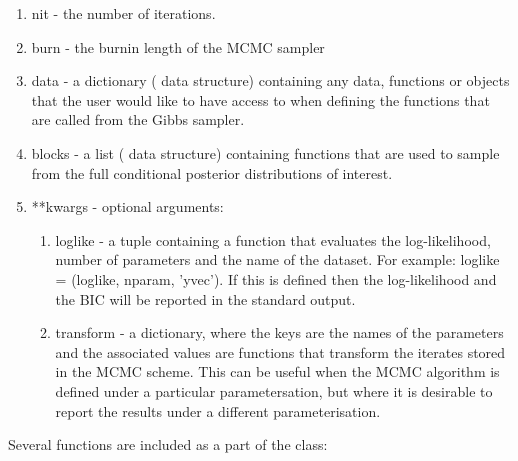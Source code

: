 \documentclass[article]{jss}
\begin{document}
\begin{enumerate}
\item nit - the number of iterations. 
\item burn - the burnin length of the MCMC sampler 
\item data - a dictionary ( data structure)
  containing any data, functions or objects that the user would like
  to have access to when defining the functions that are called from
  the Gibbs sampler.
\item blocks - a list ( data structure) containing functions that
  are used to sample from the full conditional posterior distributions
  of interest. 
\item {*}{*}kwargs - optional arguments:
  
  \begin{enumerate}
  \item loglike - a tuple containing a function that evaluates the log-likelihood,
    number of parameters and the name of the dataset. For example: loglike
    = (loglike, nparam, 'yvec'). If this is defined then the log-likelihood
    and the BIC will be reported in the standard output.
  \item transform - a dictionary, where the keys are the names of the parameters
    and the associated values are functions that transform the iterates
    stored in the MCMC scheme. This can be useful when the MCMC algorithm
    is defined under a particular parametersation, but where it is desirable
    to report the results under a different parameterisation.
\end{enumerate}
\end{enumerate}
Several functions are included as a part of the class: 
\end{document}
